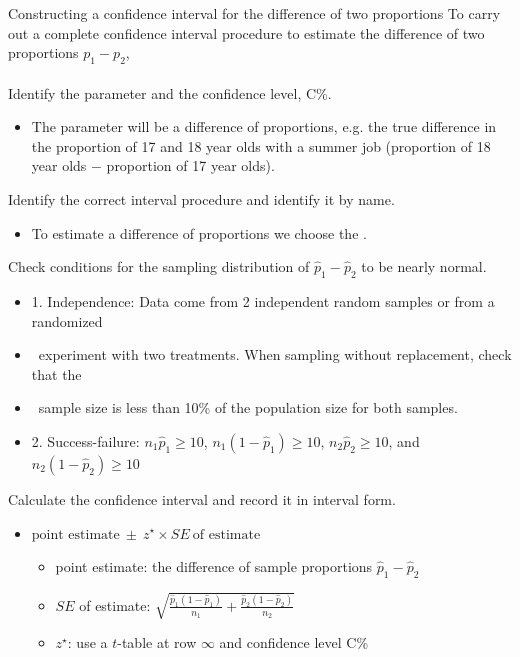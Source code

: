 \begin{onebox}{Constructing a confidence interval for the difference of two proportions}
To carry out a complete confidence interval procedure to estimate the difference of two proportions $p_1-p_2$,
\\
\\
  Identify the parameter and the confidence level, C\%.\vspace{-1mm}
\begin{itemize}
\item[]  The parameter will be a difference of proportions, e.g. the true difference in the proportion of 17 and 18 year olds with a summer job (proportion of 18 year olds $-$ proportion of 17 year olds).
\end{itemize} \vspace{-1mm}
 Identify the correct interval procedure and identify it by name. \vspace{-1mm}
\begin{itemize}
\item[] To estimate a difference of proportions we choose the .
\end{itemize}
  Check conditions for the sampling distribution of $\hat{p}_1-\hat{p}_2$ to be nearly normal.\vspace{-1mm}
\begin{itemize}
\setlength{\itemsep}{0mm}
\item[] 1. Independence:  Data come from 2 independent random samples or from a randomized 
\item[] \quad \ experiment with two treatments.  When sampling without replacement, check that the 
\item[] \quad \ sample size is less than 10\% of the population size for both samples.
\item[] 2.  Success-failure:  $n_1\hat{p}_1\geq10$, $n_1(1-\hat{p}_1)\geq10$,  $n_2\hat{p}_2\geq10$, and $n_2(1-\hat{p}_2)\geq10$
\end{itemize}
   Calculate the confidence interval and record it in interval form.
\begin{itemize}
\item[] $\text{point estimate}\ \pm\ z^{\star} \times SE\ \text{of estimate}$
\begin{itemize}
\item[] point estimate:  the difference of sample proportions $\hat{p}_1 - \hat{p}_2$
\item[] $SE$ of estimate:  $\sqrt{\frac{\hat{p}_1(1-\hat{p}_1)}{n_1} + \frac{\hat{p}_2(1-\hat{p}_2)}{n_2}}$\item[] $z^{\star}$: use a $t$-table at row $\infty$ and confidence level C\%

\end{itemize}
\end{itemize}
\end{onebox}
